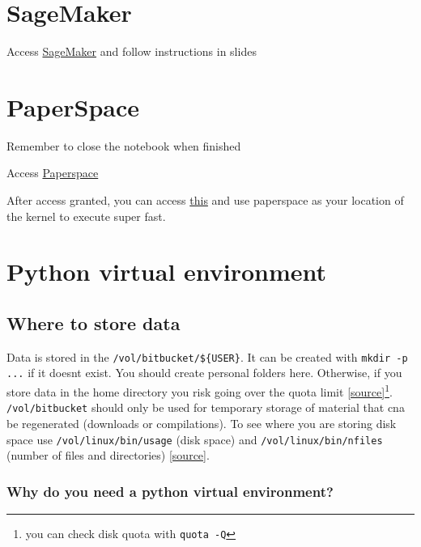\documentclass[11pt]{article}
\begin{document}
\section{SageMaker}

Access \href{https://studiolab.sagemaker.aws/}{SageMaker} and follow instructions in slides

\section{PaperSpace}

\begin{warning}
    Remember to close the notebook when finished
\end{warning}

Access \href{https://console.paperspace.com/login}{Paperspace}

After access granted, you can access \href{https://docs.paperspace.com/gradient/notebooks/notebooks-remote-kernel/}{this} and use paperspace as your location of the kernel to execute super fast.  

\section{Python virtual environment}\label{sect:python-venv}

\subsection{Where to store data}

Data is stored in the \verb|/vol/bitbucket/${USER}|. It can be created with \verb|mkdir -p ...| if it doesnt exist. You should create personal folders here. Otherwise, if you store data in the home directory you risk going over the quota limit \href{https://www.imperial.ac.uk/computing/people/csg/guides/python/virtual-environment/#d.en.1235829}{[source]}\footnote{you can check disk quota with \texttt{quota -Q}}. \texttt{/vol/bitbucket} should only be used for temporary storage of material that cna be regenerated (downloads or compilations). To see where you are storing disk space use \texttt{/vol/linux/bin/usage} (disk space) and \texttt{/vol/linux/bin/nfiles} (number of files and directories) \href{https://www.imperial.ac.uk/computing/people/csg/guides/python/virtual-environment/#d.en.1235829}{[source]}.

\subsubsection{Why do you need a python virtual environment?}
\end{document}
